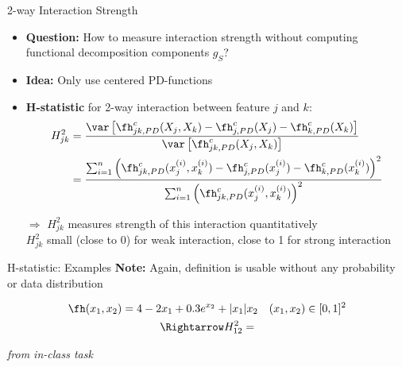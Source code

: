 \documentclass[11pt,compress,t,notes=noshow, aspectratio=169, xcolor=table]{beamer}
\begin{document}
\begin{frame}{2-way Interaction Strength}
\begin{itemize}
    \item \textbf{Question:} How to measure interaction strength without computing functional decomposition components $g_S$?
    \item \textbf{Idea:} Only use centered PD-functions
    \item \textbf{H-statistic} for 2-way interaction between feature $j$ and $k$:
    \begin{align*}
    H^2_{jk}
    & = \frac{
        \var \left[ \fh^c_{jk,PD}(X_j, X_k) - \fh^c_{j, PD}(X_j) - \fh^c_{k, PD}(X_k) \right]
    }{ \var \left[ \fh^c_{jk,PD}(X_j, X_k) \right] } \\
    & = \frac{
        \sum_{i=1}^n \left( \fh^c_{jk,PD}(x_j^{(i)}, x_k^{(i)})
        - \fh^c_{j, PD}(x_j^{(i)}) - \fh^c_{k, PD}(x_k^{(i)}) \right)^2
    }{
        \sum_{i=1}^n \left( \fh^c_{jk,PD}(x_j^{(i)}, x_k^{(i)}) \right)^2
    }
    \end{align*}
    \item[$\Rightarrow$]
    $H^2_{jk}$ measures strength of this interaction quantitatively \\
    $H^2_{jk}$ small (close to 0) for weak interaction, close to 1 for strong interaction
\end{itemize}




\end{frame}



\begin{frame}{H-statistic: Examples}
\textbf{Note:} Again, definition is usable without any probability or data distribution
\begin{example}
    \begin{multline*}
    \fh(x_1, x_2) = 4 - 2x_1 + 0.3 e^{x_2} + |x_1|x_2
    \quad (x_1, x_2) \in [0,1]^2 \\
    \Rightarrow H^2_{12} =         
    \end{multline*}    
\end{example}
\begin{example}
    \textit{from in-class task}
\end{example}
\end{frame}
\end{document}
